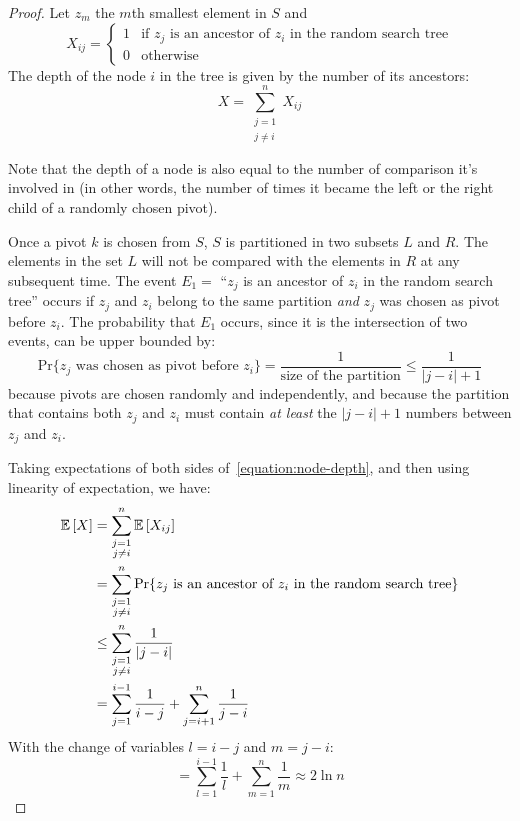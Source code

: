 \begin{proof}
  Let $z_m$ the $m$th smallest element in $S$ and $$X_{ij}=
  \left\{
    \begin{array}{ll}
      1 & \mbox{if $z_j$ is an ancestor of $z_i$ in the random search tree} \\
      0 & \mbox{otherwise}
    \end{array}
  \right.$$
  The depth of the node $i$ in the tree is given by the number of its ancestors:
  \begin{equation}
    X=\sum_{\substack{j=1 \\ j\ne i}}^n X_{ij}
    \label{equation:node-depth}
  \end{equation}

  Note that the depth of a node is also equal to the number of comparison it's
  involved in (in other words, the number of times it became the left or the
  right child of a randomly chosen pivot).

  Once a pivot $k$ is chosen from $S$, $S$ is partitioned in two subsets $L$ and
  $R$. The elements in the set $L$ will not be compared with the elements in $R$
  at any subsequent time. The event $E_1=$ ``$z_j$ is an ancestor of $z_i$ in the
  random search tree'' occurs if $z_j$ and $z_i$ belong to the same partition
  \emph{and} $z_j$ was chosen as pivot before $z_i$. The probability that $E_1$
  occurs, since it is the intersection of two events, can be upper bounded by:
  $$\text{Pr}\{ z_j \text{ was chosen as pivot before } z_i
  \}=\frac{1}{\text{size of the partition}}\leq\frac{1}{|j-i|+1}$$ because
  pivots are chosen randomly and independently, and because the partition that
  contains both $z_j$ and $z_i$ must contain \emph{at least} the $|j-i|+1$
  numbers between $z_j$ and $z_i$.

  Taking expectations of both sides of~\eqref{equation:node-depth}, and then
  using linearity of expectation, we have:
  \begin{align*}
    \mathbb{E}\left[{X}\right] & = \sum_{\substack{j=1\\ j\ne i}}^n \mathbb{E}\left[{X_{ij}}\right] \\
    & = \sum_{\substack{j=1\\ j\ne i}}^n \text{Pr}\{ z_j \text{ is an ancestor
      of } z_i \text{ in the random search tree} \} \\
    & \le \sum_{\substack{j=1\\ j\ne i}}^n \frac{1}{|j-i|} \\
    & = \sum_{j=1}^{i-1} \frac{1}{i-j} + \sum_{j=i+1}^{n} \frac{1}{j-i}
  \end{align*}
  With the change of variables $l=i-j$ and $m=j-i$:
  \begin{equation*}
    = \sum_{l=1}^{i-1} \frac{1}{l} + \sum_{m=1}^{n} \frac{1}{m} \approx 2\ln n
  \end{equation*}

\end{proof}

